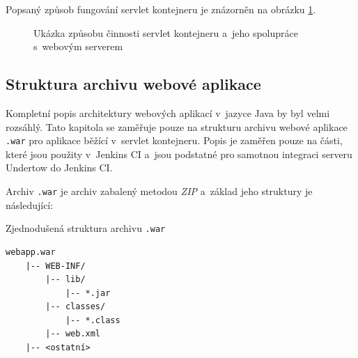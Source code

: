             Popsaný způsob fungování servlet kontejneru je znázorněn na obrázku \ref{imgServlet}.
            \begin{figure}[ht]
                \begin{center}
                    \caption{Ukázka způsobu činnosti servlet kontejneru a~jeho spolupráce s~webovým serverem \cite{webserverVsServletPage}}
                    \label{imgServlet}
                \end{center}
            \end{figure}   %

        \subsection{Struktura archivu webové aplikace} \label{kapWebXml}
            Kompletní popis architektury webových aplikací v~jazyce Java by byl velmi rozsáhlý. 
            Tato kapitola se zaměřuje pouze na strukturu archivu webové aplikace \texttt{.war} pro aplikace běžící v~servlet kontejneru.
            Popis je zaměřen pouze na části, které jsou použity v~Jenkins CI a~jsou podstatné
            pro samotnou integraci serveru Undertow do Jenkins CI.

            \medskip
            Archiv \texttt{.war} je archiv zabalený metodou \emph{ZIP} a~základ jeho struktury je následující:
            
\begin{priklad} Zjednodušená struktura archivu \texttt{.war}
\begin{verbatim}
webapp.war
    |-- WEB-INF/
        |-- lib/
            |-- *.jar
        |-- classes/
            |-- *.class
        |-- web.xml
    |-- <ostatní>
\end{verbatim}
\end{priklad}


